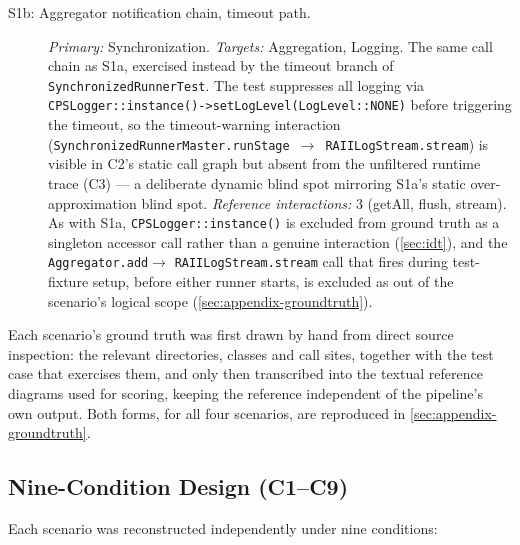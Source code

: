 \begin{description}
  \item[S1b: Aggregator notification chain, timeout path.]
    \emph{Primary:} Synchronization. \emph{Targets:} Aggregation, Logging.
    The same call chain as S1a, exercised instead by the timeout branch
    of \texttt{SynchronizedRunnerTest}. The test suppresses all logging
    via \texttt{CPSLogger::instance()->setLogLevel(LogLevel::NONE)} before
    triggering the timeout, so the timeout-warning interaction
    (\texttt{SynchronizedRunnerMaster.runStage}~$\to$~\texttt{RAIILogStream.stream})
    is visible in C2's static call graph but absent from the unfiltered
    runtime trace (C3) --- a deliberate dynamic blind spot mirroring S1a's
    static over-approximation blind spot.
    \emph{Reference interactions:} 3 (getAll, flush, stream). As with
    S1a, \texttt{CPSLogger::instance()} is excluded from ground truth as
    a singleton accessor call rather than a genuine interaction
    (\cref{sec:idt}), and the \texttt{Aggregator.add}$\to$
    \texttt{RAIILogStream.stream} call that fires during test-fixture
    setup, before either runner starts, is excluded as out of the
    scenario's logical scope (\cref{sec:appendix-groundtruth}).
\end{description}

Each scenario's ground truth was first drawn by hand from direct source
inspection: the relevant directories, classes and call sites, together
with the test case that exercises them, and only then transcribed into
the \sysml textual reference diagrams used for scoring, keeping the
reference independent of the pipeline's own output. Both forms, for
all four scenarios, are reproduced in
\cref{sec:appendix-groundtruth}.

\subsection{Nine-Condition Design (C1--C9)}\label{sec:conditions}

Each scenario was reconstructed independently under nine conditions:

